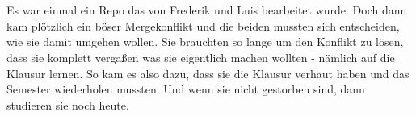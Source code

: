
\newcommand{\germanQuote}[1]{„\textit{#1}“}
\newcommand{\englishQuote}[1]{``\textit{#1}''}



\chapter{\chapterTwo}
Es war einmal ein Repo das von Frederik und Luis bearbeitet wurde.
Doch dann kam plötzlich ein böser Mergekonflikt und die beiden mussten sich entscheiden, wie sie damit umgehen wollen.
Sie brauchten so lange um den Konflikt zu lösen, dass sie komplett vergaßen was sie eigentlich machen wollten - nämlich auf die Klausur lernen.
So kam es also dazu, dass sie die Klausur verhaut haben und das Semester wiederholen mussten.
Und wenn sie nicht gestorben sind, dann studieren sie noch heute.

